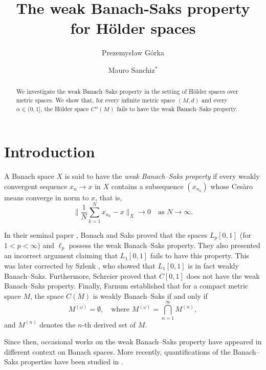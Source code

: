 \documentclass[11pt, reqno]{amsart}
\title[Banach-Saks property for Hölder spaces]{The weak Banach-Saks property for Hölder spaces}
\author[Górka]{Prezemysław Górka}
\author[Sanchiz]{Mauro Sanchiz$^{*}$}
\begin{document}
\begin{abstract}
We investigate the weak Banach--Saks property in the setting of H\"older spaces over metric spaces. We show that, for every infinite metric space $(M,d)$ and every $\alpha \in (0,1]$, the H\"older space $C^{\alpha}(M)$ fails to have the weak Banach--Saks property. 


\end{abstract}


\maketitle %



\bigskip
\section{Introduction}
A Banach space $X$ is said to have the \emph{weak Banach--Saks property} if every weakly convergent sequence $x_n \to x$ in $X$ contains a subsequence $(x_{n_k})$ whose Ces\`aro means converge in norm to $x$, that is,
\[
\Big\| \frac{1}{N} \sum_{k=1}^N x_{n_k} - x \Big\|_X \longrightarrow 0 
\quad \text{as } N \to \infty.
\]

In their seminal paper \cite{banach_sur_1930}, Banach and Saks proved that the spaces $L_p[0,1]$ (for $1 < p < \infty$) and $\ell_p$ possess the weak Banach--Saks property. They also presented an incorrect argument claiming that $L_1[0,1]$ fails to have this property. This was later corrected by Szlenk \cite{szlenk_sur_1965}, who showed that $L_1[0,1]$ is in fact weakly Banach--Saks. Furthermore, Schreier \cite{schreier_gegenbeispiel_1930} proved that $C[0,1]$ does not have the weak Banach--Saks property. Finally, Farnum \cite{farnum_banach-saks_1974} established that for a compact metric space $M$, the space $C(M)$ is weakly Banach--Saks if and only if
\[
M^{(\omega)} = \emptyset, 
\quad \text{where } 
M^{(\omega)} = \bigcap_{n=1}^{\infty} M^{(n)},
\]
and $M^{(n)}$ denotes the $n$-th derived set of $M$.

Since then, occasional works on the weak Banach--Saks property have appeared in different context on Banach spaces. More recently, quantifications of the Banach--Saks properties have been studied in \cite{bendova_quantification_2015, silber_quantification_2023}.
\end{document}
